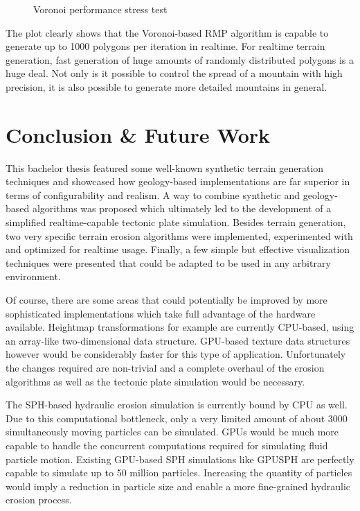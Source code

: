 \documentclass[11pt,a4paper,twoside,openright]{report}
\begin{document}
\begin{figure}[h]
\centering
{}
\caption{Voronoi performance stress test}
\label{fig:voronoiperformancestresstest}
\end{figure}
The plot clearly shows that the Voronoi-based RMP algorithm is capable to generate up to 1000 polygons per iteration in realtime. For realtime terrain generation, fast generation of huge amounts of randomly distributed polygons is a huge deal. Not only is it possible to control the spread of a mountain with high precision, it is also possible to generate more detailed mountains in general.

\chapter{Conclusion \& Future Work}
\label{sec:concl}
This bachelor thesis featured some well-known synthetic terrain generation techniques and showcased how geology-based implementations are far superior in terms of configurability and realism. A way to combine synthetic and geology-based algorithms was proposed which ultimately led to the development of a simplified realtime-capable tectonic plate simulation. Besides terrain generation, two very specific terrain erosion algorithms were implemented, experimented with and optimized for realtime usage. Finally, a few simple but effective visualization techniques were presented that could be adapted to be used in any arbitrary environment.

Of course, there are some areas that could potentially be improved by more sophisticated implementations which take full advantage of the hardware available.  Heightmap transformations for example are currently CPU-based, using an array-like two-dimensional data structure. GPU-based texture data structures however would be considerably faster for this type of application. Unfortunately the changes required are non-trivial and a complete overhaul of the erosion algorithms as well as the tectonic plate simulation would be necessary.

The SPH-based hydraulic erosion simulation is currently bound by CPU as well. Due to this computational bottleneck, only a very limited amount of about 3000 simultaneously moving particles can be simulated. GPUs would be much more capable to handle the concurrent computations required for simulating fluid particle motion. Existing GPU-based SPH simulations like GPUSPH \cite{GPUSPH:2008} are perfectly capable to simulate up to 50 million particles. Increasing the quantity of particles would imply a reduction in particle size and enable a more fine-grained hydraulic erosion process.
\end{document}
